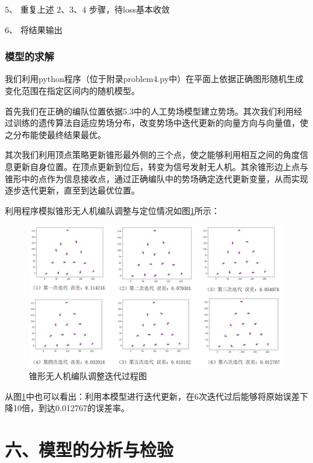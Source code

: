 \documentclass{my_paper}
\begin{document}
$5、$ 重复上述 $2、3、4$ 步骤，待loss基本收敛

$6、$ 将结果输出


\subsubsection{模型的求解}

我们利用python程序（位于附录problem4.py中）在平面上依据正确图形随机生成变化范围在指定区间内的随机模型。

首先我们在正确的编队位置依据5.3中的人工势场模型建立势场。其次我们利用经过训练的遗传算法自适应势场分布，改变势场中迭代更新的向量方向与向量值，使之分布能使最终结果最优。

其次我们利用顶点策略更新锥形最外侧的三个点，使之能够利用相互之间的角度信息更新自身位置。在顶点更新到位后，转变为信号发射无人机。其余锥形边上点与锥形中的点作为信息接收点，通过正确编队中的势场确定迭代更新变量，从而实现逐步迭代更新，直至到达最优位置。

利用程序模拟锥形无人机编队调整与定位情况如图\ref{moxing4}所示：

\begin{figure}[h]
    \centering
    \includegraphics[width=1\textwidth]{moxing4.jpg}
    \caption{锥形无人机编队调整迭代过程图}
    \label{moxing4}
\end{figure}

从图\ref{moxing4}中也可以看出：利用本模型进行迭代更新，在6次迭代过后能够将原始误差下降10倍，到达0.012767的误差率。





\section{六、模型的分析与检验}
\end{document}
